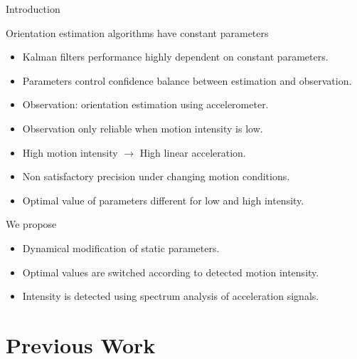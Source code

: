 \documentclass[10pt,aspectratio=1610]{beamer}
\begin{document}
\begin{frame}{Introduction}{}
\begin{block}{Orientation estimation algorithms have constant parameters}
\begin{itemize}
	\item Kalman filters performance highly dependent on constant parameters.
	\item Parameters control confidence balance between estimation and observation.
	\item Observation: orientation estimation using accelerometer.
	\item Observation only reliable when motion intensity is low.
	\item High motion intensity $\rightarrow$ High linear acceleration.
	\item Non satisfactory precision under changing motion conditions.
	\item Optimal value of parameters different for low and high intensity.
\end{itemize}
\end{block}
\begin{block}{We propose}
\begin{itemize}
	\item Dynamical modification of static parameters.
	\item Optimal values are switched according to detected motion intensity.
	\item Intensity is detected using spectrum analysis of acceleration signals.
\end{itemize}
\end{block}
\end{frame}

\section{Previous Work}
\label{sec:previous_work}
\end{document}
